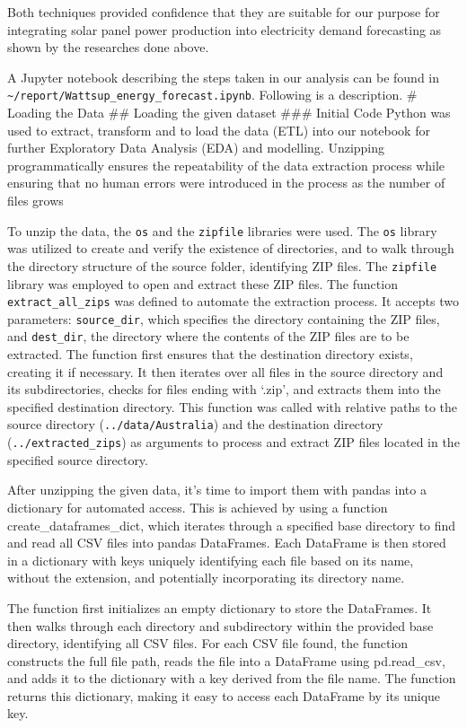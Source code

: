 \documentclass[
]{article}
\begin{document}
Both techniques provided confidence that they are suitable for our
purpose for integrating solar panel power production into electricity
demand forecasting as shown by the researches done above.

A Jupyter notebook describing the steps taken in our analysis can be
found in
\texttt{\textasciitilde{}/report/Wattsup\_energy\_forecast.ipynb}.
Following is a description. \# Loading the Data \#\# Loading the given
dataset \#\#\# Initial Code Python was used to extract, transform and to
load the data (ETL) into our notebook for further Exploratory Data
Analysis (EDA) and modelling. Unzipping programmatically ensures the
repeatability of the data extraction process while ensuring that no
human errors were introduced in the process as the number of files grows

To unzip the data, the \texttt{os} and the \texttt{zipfile} libraries
were used. The \texttt{os} library was utilized to create and verify the
existence of directories, and to walk through the directory structure of
the source folder, identifying ZIP files. The \texttt{zipfile} library
was employed to open and extract these ZIP files. The function
\texttt{extract\_all\_zips} was defined to automate the extraction
process. It accepts two parameters: \texttt{source\_dir}, which
specifies the directory containing the ZIP files, and
\texttt{dest\_dir}, the directory where the contents of the ZIP files
are to be extracted. The function first ensures that the destination
directory exists, creating it if necessary. It then iterates over all
files in the source directory and its subdirectories, checks for files
ending with `.zip', and extracts them into the specified destination
directory. This function was called with relative paths to the source
directory
(\texttt{\textquotesingle{}../data/Australia\textquotesingle{}}) and the
destination directory
(\texttt{\textquotesingle{}../extracted\_zips\textquotesingle{}}) as
arguments to process and extract ZIP files located in the specified
source directory.

After unzipping the given data, it's time to import them with pandas
into a dictionary for automated access. This is achieved by using a
function create\_dataframes\_dict, which iterates through a specified
base directory to find and read all CSV files into pandas DataFrames.
Each DataFrame is then stored in a dictionary with keys uniquely
identifying each file based on its name, without the extension, and
potentially incorporating its directory name.

The function first initializes an empty dictionary to store the
DataFrames. It then walks through each directory and subdirectory within
the provided base directory, identifying all CSV files. For each CSV
file found, the function constructs the full file path, reads the file
into a DataFrame using pd.read\_csv, and adds it to the dictionary with
a key derived from the file name. The function returns this dictionary,
making it easy to access each DataFrame by its unique key.
\end{document}
